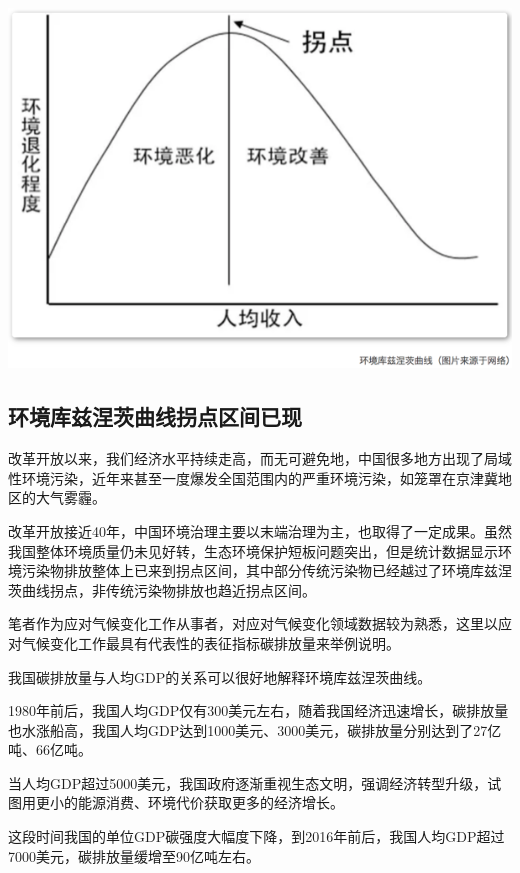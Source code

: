 \documentclass[
]{book}
\begin{document}
\includegraphics[width=8.33in]{images/huanjing1}

\hypertarget{ux73afux5883ux5e93ux5179ux6d85ux8328ux66f2ux7ebfux62d0ux70b9ux533aux95f4ux5df2ux73b0}{%
\subsection{环境库兹涅茨曲线拐点区间已现}\label{ux73afux5883ux5e93ux5179ux6d85ux8328ux66f2ux7ebfux62d0ux70b9ux533aux95f4ux5df2ux73b0}}

改革开放以来，我们经济水平持续走高，而无可避免地，中国很多地方出现了局域性环境污染，近年来甚至一度爆发全国范围内的严重环境污染，如笼罩在京津冀地区的大气雾霾。

改革开放接近40年，中国环境治理主要以末端治理为主，也取得了一定成果。虽然我国整体环境质量仍未见好转，生态环境保护短板问题突出，但是统计数据显示环境污染物排放整体上已来到拐点区间，其中部分传统污染物已经越过了环境库兹涅茨曲线拐点，非传统污染物排放也趋近拐点区间。

笔者作为应对气候变化工作从事者，对应对气候变化领域数据较为熟悉，这里以应对气候变化工作最具有代表性的表征指标碳排放量来举例说明。

我国碳排放量与人均GDP的关系可以很好地解释环境库兹涅茨曲线。

1980年前后，我国人均GDP仅有300美元左右，随着我国经济迅速增长，碳排放量也水涨船高，我国人均GDP达到1000美元、3000美元，碳排放量分别达到了27亿吨、66亿吨。

当人均GDP超过5000美元，我国政府逐渐重视生态文明，强调经济转型升级，试图用更小的能源消费、环境代价获取更多的经济增长。

这段时间我国的单位GDP碳强度大幅度下降，到2016年前后，我国人均GDP超过7000美元，碳排放量缓增至90亿吨左右。
\end{document}
